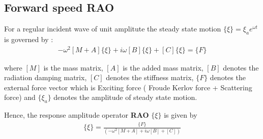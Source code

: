 \subsection{Forward speed RAO}
For a regular incident wave of unit amplitute the steady state motion  $\{\xi\} = \xi_a e^{\omega t}$
is governed by :
\begin{align}
    -\omega^2[M + A]\{\xi\} + i\omega[B]\{\xi\} + [C]\{\xi\} = \{F\}
\end{align}

where $[M]$ is the mass matrix, $[A]$ is the added mass matrix, 
$[B]$ denotes the radiation damping matrix, $[C]$ denotes the stiffness matrix, 
$\{F\}$ denotes the external force vector which is Exciting force ( Froude Kerlov force + Scattering force) 
and $\{\xi_a\}$ denotes the amplitude of steady state motion. 

Hence, the response amplitude operator {\bf RAO} $\{\xi\}$ is given by  
\begin{align}
    \{\xi\} = \frac {\{F\}}{\left(-\omega^2[M + A] + i\omega[B] + [C]\right)}
\end{align}
